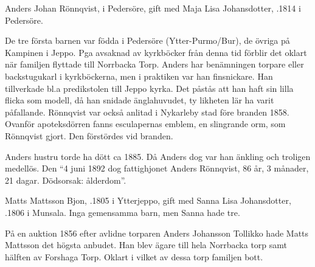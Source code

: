 %
Anders Johan Rönnqvist,  i Pedersöre, gift med Maja Lisa Johansdotter, .1814 i Pedersöre.
\begin{jhchildren}
  \item {}
  \item {}
  \item {}
  \item {}
  \item {}
  \item {}
  \item {}
  \item {}
\end{jhchildren}

De tre första barnen var födda i Pedersöre (Ytter-Purmo/Bur), de övriga på Kampinen i Jeppo. Pga avsaknad av kyrkböcker från denna tid förblir det oklart när familjen flyttade till Norrbacka Torp. Anders har benämningen torpare eller backstugukarl i kyrkböckerna, men i praktiken var han finsnickare. Han tillverkade bl.a predikstolen till Jeppo kyrka. Det påstås att han haft sin lilla flicka som modell, då han snidade änglahuvudet, ty likheten lär ha varit påfallande. Rönnqvist var också anlitad i Nykarleby stad före branden 1858. Ovanför apoteksdörren fanns esculapernas emblem, en slingrande orm, som Rönnqvist gjort. Den förstördes vid branden.

Anders hustru torde ha dött ca 1885. Då Anders dog var han änkling och troligen medellös. Den ``4 juni 1892 dog fattighjonet Anders Rönnqvist, 86 år, 3 månader, 21 dagar. Dödsorsak: ålderdom''.



%
Matts Mattsson Bjon, .1805 i Ytterjeppo, gift med Sanna Lisa Johansdotter, .1806 i Munsala. Inga gemensamma barn, men Sanna hade tre.
\begin{jhchildren}
  \item {}
  \item {}
  \item {}
  \item {}
\end{jhchildren}
På en auktion 1856 efter avlidne torparen Anders Johansson Tollikko hade Matts Mattsson det högsta anbudet. Han blev ägare till hela	Norrbacka torp samt hälften av Forshaga Torp. Oklart i vilket av dessa torp  familjen bott.


